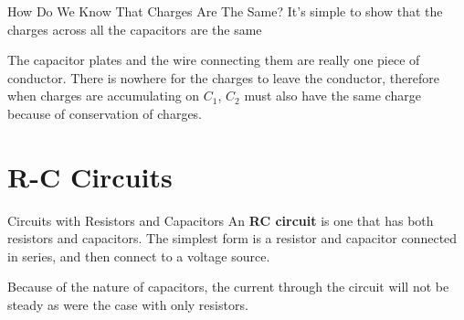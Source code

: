\documentclass[12pt,aspectratio=169]{beamer}
\begin{document}
\begin{frame}{How Do We Know That Charges Are The Same?}
  It's simple to show that the charges across all the capacitors are the same
  \begin{center}
  \end{center}
  The capacitor plates and the wire connecting them are really one piece of
  conductor. There is nowhere for the charges to leave the conductor, therefore
  when charges are accumulating on $C_1$, $C_2$ must also have the same charge
  because of conservation of charges.
\end{frame}



\section{R-C Circuits}

\begin{frame}{Circuits with Resistors and Capacitors}
  An \textbf{RC circuit} is one that has both resistors and capacitors. The
  simplest form is a resistor and capacitor connected in series, and then
  connect to a voltage source.
  \begin{center}
  \end{center}
  Because of the nature of capacitors, the current through the circuit will not
  be steady as were the case with only resistors.
\end{frame}
\end{document}
